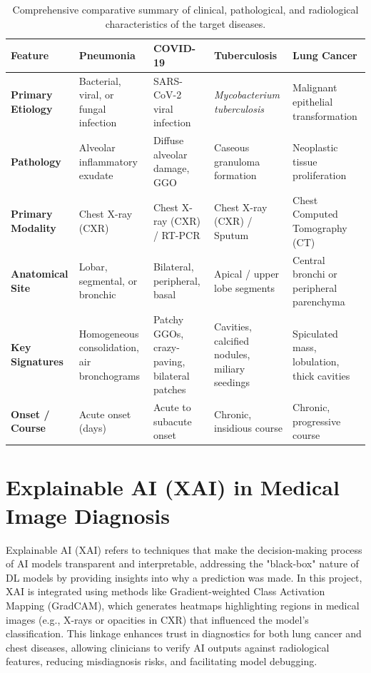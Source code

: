 \begin{table}[htbp]
	\centering
	\caption{Comprehensive comparative summary of clinical, pathological, and radiological characteristics of the target diseases.}
	\label{tab:comparative_radiology}
	\small %
	\begin{tabularx}{\textwidth}{lXXXX}
		\toprule
		\textbf{Feature} & \textbf{Pneumonia} & \textbf{COVID-19} & \textbf{Tuberculosis} & \textbf{Lung Cancer} \\
		\midrule
		\textbf{Primary Etiology} & Bacterial, viral, or fungal infection & SARS-CoV-2 viral infection & \textit{Mycobacterium tuberculosis} & Malignant epithelial transformation \\
		\addlinespace
		\textbf{Pathology} & Alveolar inflammatory exudate & Diffuse alveolar damage, GGO & Caseous granuloma formation & Neoplastic tissue proliferation \\
		\addlinespace
		\textbf{Primary Modality} & Chest X-ray (CXR) & Chest X-ray (CXR) / RT-PCR & Chest X-ray (CXR) / Sputum & Chest Computed Tomography (CT) \\
		\addlinespace
		\textbf{Anatomical Site} & Lobar, segmental, or bronchic & Bilateral, peripheral, basal & Apical / upper lobe segments & Central bronchi or peripheral parenchyma \\
		\addlinespace
		\textbf{Key Signatures} & Homogeneous consolidation, air bronchograms & Patchy GGOs, crazy-paving, bilateral patches & Cavities, calcified nodules, miliary seedings & Spiculated mass, lobulation, thick cavities \\
		\addlinespace
		\textbf{Onset / Course} & Acute onset (days) & Acute to subacute onset & Chronic, insidious course & Chronic, progressive course \\
		\bottomrule
	\end{tabularx}
\end{table}

\section{Explainable AI (XAI) in Medical Image Diagnosis}

Explainable AI (XAI) refers to techniques that make the decision-making process of AI models transparent and interpretable, addressing the "black-box" nature of DL models by providing insights into why a prediction was made. In this project, XAI is integrated using methods like Gradient-weighted Class Activation Mapping (GradCAM), which generates heatmaps highlighting regions in medical images (e.g., X-rays or opacities in CXR) that influenced the model's classification. This linkage enhances trust in diagnostics for both lung cancer and chest diseases, allowing clinicians to verify AI outputs against radiological features, reducing misdiagnosis risks, and facilitating model debugging.

